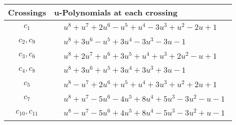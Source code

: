 \documentclass[1p]{elsarticle_modified}
\theoremstyle{definition}
\begin{document}
\begin{tabular}{m{50pt}|m{274pt}}
Crossings & \hspace{64pt}u-Polynomials at each crossing \\
\hline $$\begin{aligned}c_{1}\end{aligned}$$&$\begin{aligned}
&u^8+u^7+2 u^6- u^5+u^4-3 u^3+u^2-2 u+1
\end{aligned}$\\
\hline $$\begin{aligned}c_{2},c_{9}\end{aligned}$$&$\begin{aligned}
&u^8+3 u^6- u^5+3 u^4-3 u^3-3 u-1
\end{aligned}$\\
\hline $$\begin{aligned}c_{3},c_{6}\end{aligned}$$&$\begin{aligned}
&u^8+2 u^7+u^6+3 u^5+u^4+u^3+2 u^2- u+1
\end{aligned}$\\
\hline $$\begin{aligned}c_{4},c_{8}\end{aligned}$$&$\begin{aligned}
&u^8+3 u^6+u^5+3 u^4+3 u^3+3 u-1
\end{aligned}$\\
\hline $$\begin{aligned}c_{5}\end{aligned}$$&$\begin{aligned}
&u^8- u^7+2 u^6+u^5+u^4+3 u^3+u^2+2 u+1
\end{aligned}$\\
\hline $$\begin{aligned}c_{7}\end{aligned}$$&$\begin{aligned}
&u^8+u^7-5 u^6-4 u^5+8 u^4+5 u^3-3 u^2- u-1
\end{aligned}$\\
\hline $$\begin{aligned}c_{10},c_{11}\end{aligned}$$&$\begin{aligned}
&u^8- u^7-5 u^6+4 u^5+8 u^4-5 u^3-3 u^2+u-1
\end{aligned}$\\
\hline
\end{tabular}\\~\\
\end{document}
